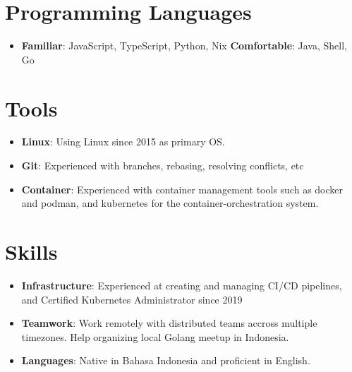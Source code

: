 \documentclass[letterpaper,11pt]{article}
\newcommand{\resumeItem}[2]{
\item\small{
        \textbf{#1}{: #2 \vspace{-2pt}}
    }
}
\newcommand{\resumeSubHeadingListStart}{\begin{itemize}[leftmargin=*]}
\newcommand{\resumeSubHeadingListEnd}{\end{itemize}}
\begin{document}
\section{Programming Languages}
\resumeSubHeadingListStart
    \item{
            \textbf{Familiar}{: JavaScript, TypeScript, Python, Nix}
            \hfill
            \textbf{Comfortable}{: Java, Shell, Go}
        }
        \resumeSubHeadingListEnd

        \section{Tools}
        \resumeSubHeadingListStart
        \resumeItem{Linux}
        {Using Linux since 2015 as primary OS.}
        \resumeItem{Git}
        {Experienced with branches, rebasing, resolving conflicts, etc}
        \resumeItem{Container}
        {Experienced with container management tools such as docker and podman, and kubernetes for the container-orchestration system.}
        \resumeSubHeadingListEnd

        \section{Skills}
        \resumeSubHeadingListStart
        \resumeItem{Infrastructure}
        {Experienced at creating and managing CI/CD pipelines, and Certified Kubernetes Administrator since 2019}
        \resumeItem{Teamwork}
        {Work remotely with distributed teams accross multiple timezones. Help organizing local Golang meetup in Indonesia.}
        \resumeItem{Languages}
        {Native in Bahasa Indonesia and proficient in English.}
        \resumeSubHeadingListEnd

  
\end{document}
